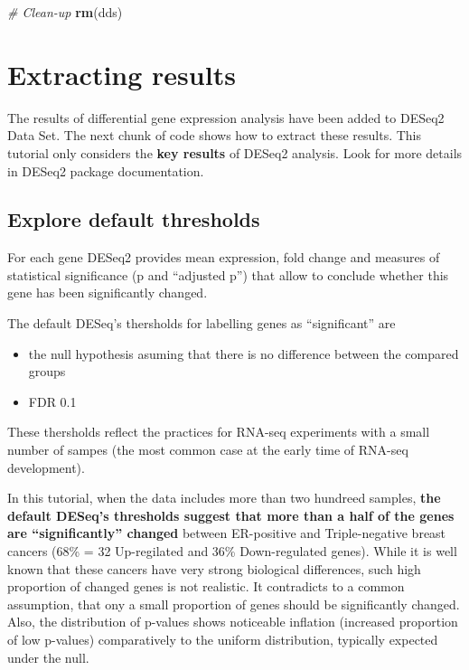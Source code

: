 \documentclass[]{book}
\newenvironment{Shaded}{\begin{snugshade}}{\end{snugshade}}
\newcommand{\KeywordTok}[1]{\textcolor[rgb]{0.13,0.29,0.53}{\textbf{#1}}}
\newcommand{\CommentTok}[1]{\textcolor[rgb]{0.56,0.35,0.01}{\textit{#1}}}
\newcommand{\NormalTok}[1]{#1}
\providecommand{\tightlist}{%
  \setlength{\itemsep}{0pt}\setlength{\parskip}{0pt}}
\begin{document}
\begin{Shaded}
\begin{Highlighting}[]
\CommentTok{# Clean-up}
\KeywordTok{rm}\NormalTok{(dds)}
\end{Highlighting}
\end{Shaded}

\section{Extracting results}\label{extracting-results}

The results of differential gene expression analysis have been added to
DESeq2 Data Set. The next chunk of code shows how to extract these
results. This tutorial only considers the \textbf{key results} of DESeq2
analysis. Look for more details in DESeq2 package documentation.

\subsection{Explore default
thresholds}\label{explore-default-thresholds}

For each gene DESeq2 provides mean expression, fold change and measures
of statistical significance (p and ``adjusted p'') that allow to
conclude whether this gene has been significantly changed.

The default DESeq's thersholds for labelling genes as ``significant''
are

\begin{itemize}
\tightlist
\item
  the null hypothesis asuming that there is no difference between the
  compared groups\\
\item
  FDR 0.1
\end{itemize}

These thersholds reflect the practices for RNA-seq experiments with a
small number of sampes (the most common case at the early time of
RNA-seq development).

In this tutorial, when the data includes more than two hundreed samples,
\textbf{the default DESeq's thresholds suggest that more than a half of
the genes are ``significantly'' changed} between ER-positive and
Triple-negative breast cancers (68\% = 32 Up-regilated and 36\%
Down-regulated genes). While it is well known that these cancers have
very strong biological differences, such high proportion of changed
genes is not realistic. It contradicts to a common assumption, that ony
a small proportion of genes should be significantly changed. Also, the
distribution of p-values shows noticeable inflation (increased
proportion of low p-values) comparatively to the uniform distribution,
typically expected under the null.
\end{document}
